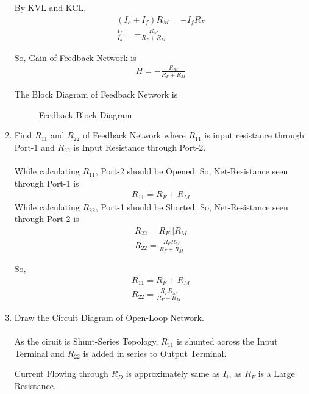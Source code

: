 \begin{enumerate}[label=\thesubsection.\arabic*.,ref=\thesubsection.\theenumi]
By KVL and KCL,
\begin{align}
(I_{o} + I_{f})R_{M} = -I_{f}R_{F}\\
\frac{I_{f}}{I_{o}} = -\frac{R_{M}}{R_{F}+R_{M}}
\end{align}

So, Gain of Feedback Network is
\begin{align}
H = -\frac{R_{M}}{R_{F}+R_{M}}
\end{align}

The Block Diagram of Feedback Network is
\begin{figure}[ht!]
	\begin{center}
		\resizebox{\columnwidth/2}{!}{}
	\end{center}
	\caption{Feedback Block Diagram}
	\label{fig:Feedback_Block}
\end{figure}

\item Find $R_{11}$ and $R_{22}$  of Feedback Network where $R_{11}$ is input resistance through Port-1 and $R_{22}$ is Input Resistance through Port-2.\\
\solution\\
While calculating $R_{11}$, Port-2 should be Opened. So, Net-Resistance seen through Port-1 is 
\begin{align}
R_{11} = R_{F} + R_{M}
\end{align}
While calculating $R_{22}$, Port-1 should be Shorted. So, Net-Resistance seen through Port-2 is 
\begin{align}
R_{22} = R_{F} || R_{M}\\
R_{22} = \frac{R_{F}R_{M}}{R_{F}+R_{M}}
\end{align}

So,
\begin{align}
R_{11} = R_{F} + R_{M}\\
R_{22} = \frac{R_{F}R_{M}}{R_{F}+R_{M}}
\end{align}

\item Draw the Circuit Diagram of Open-Loop Network.\\
\solution\\
As the ciruit is Shunt-Series Topology, $R_{11}$ is shunted across the Input Terminal and $R_{22}$ is added in series to Output Terminal.

Current Flowing through $R_{D}$ is approximately same as $I_{i}$, as $R_{F}$ is a Large Resistance.


\end{enumerate}

